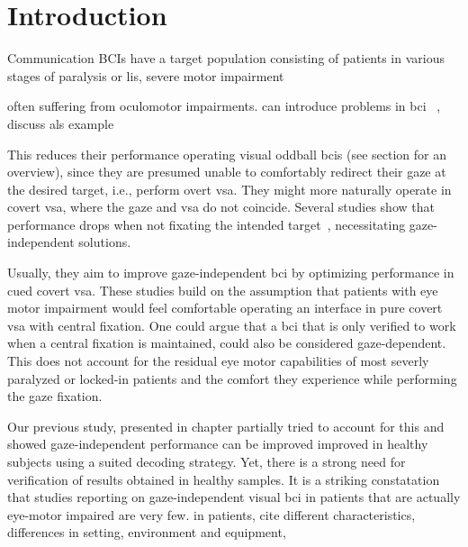 \section{Introduction}

Communication BCIs have a target population consisting of patients in various
stages of paralysis or \ac{lis},
severe motor impairment

often suffering from oculomotor impairments.
can introduce problems in bci ~\cite{Brain-computer interface (BCI) evaluation
in people with amyotrophic lateral sclerosis}, discuss als example


\cite{FriedOken2020}

This reduces their performance operating visual oddball \ac{bci}s (see
section for an overview), since they
are presumed unable to comfortably redirect their gaze at the desired target,
i.e., perform overt \ac{vsa}.
They might more naturally operate in covert \ac{vsa}, where the gaze and
\ac{vsa} do not coincide.
Several studies show that performance drops when not fixating the intended
target~\cite{Brunner2010, Frenzel2011, Treder2010, RonAngevin2019,
VanDenKerchove2024}, necessitating gaze-independent solutions.

Usually, they aim to improve gaze-independent \ac{bci} by optimizing
performance in cued covert \ac{vsa}.
These studies build on the assumption that patients with eye motor impairment
would feel comfortable operating an interface in pure covert \ac{vsa} with
central fixation.
One could argue that a \ac{bci} that is only verified to work when a central
fixation is maintained, could also be considered gaze-dependent.
This does not account for the residual eye motor capabilities of most severly
paralyzed or locked-in patients and the comfort they experience while
performing the gaze fixation.

Our previous study, presented in chapter   partially tried to account for this
and showed gaze-independent performance can be improved
improved in healthy subjects using a suited decoding strategy.
Yet, there is a strong need for verification of results obtained in healthy
samples.
It is a striking constatation that studies reporting on
gaze-independent visual \ac{bci} in patients that are actually eye-motor
impaired are very few.
in patients, cite different characteristics, differences
in setting, environment and equipment,

